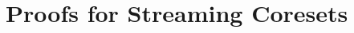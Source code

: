 \documentclass[anon,12pt]{colt2019} %
\begin{document}
%

\appendix

\section{Proofs for Streaming Coresets}
\end{document}
